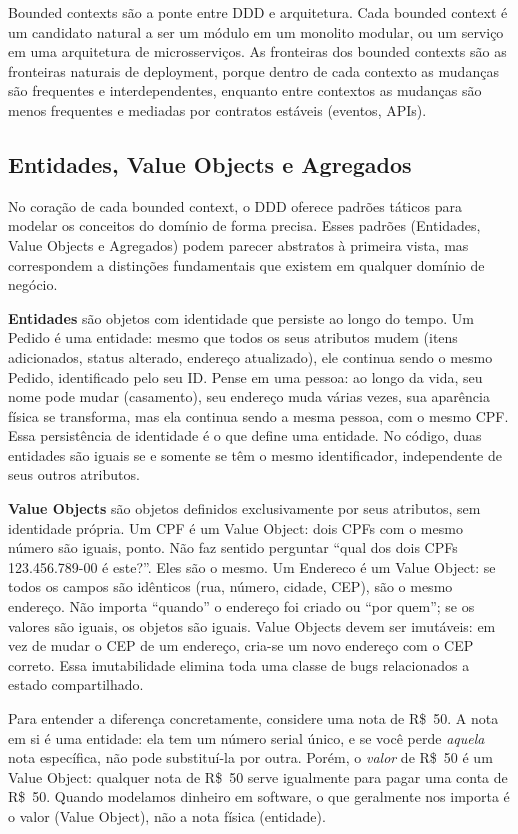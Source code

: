 Bounded contexts são a ponte entre DDD e arquitetura. Cada bounded context é um
candidato natural a ser um módulo em um monolito modular, ou um serviço em uma
arquitetura de microsserviços. As fronteiras dos bounded contexts são as
fronteiras naturais de deployment, porque dentro de cada contexto as mudanças
são frequentes e interdependentes, enquanto entre contextos as mudanças são
menos frequentes e mediadas por contratos estáveis (eventos, APIs).

\subsection{Entidades, Value Objects e Agregados}

No coração de cada bounded context, o DDD oferece padrões táticos para
modelar os conceitos do domínio de forma precisa. Esses padrões (Entidades,
Value Objects e Agregados) podem parecer abstratos à primeira vista, mas
correspondem a distinções fundamentais que existem em qualquer domínio de
negócio.

\textbf{Entidades} são objetos com identidade que persiste ao longo do tempo.
Um Pedido é uma entidade: mesmo que todos os seus atributos mudem (itens
adicionados, status alterado, endereço atualizado), ele continua sendo o mesmo
Pedido, identificado pelo seu ID. Pense em uma pessoa: ao longo da vida, seu
nome pode mudar (casamento), seu endereço muda várias vezes, sua aparência
física se transforma, mas ela continua sendo a mesma pessoa, com o mesmo
CPF. Essa persistência de identidade é o que define uma entidade. No código,
duas entidades são iguais se e somente se têm o mesmo identificador, independente
de seus outros atributos.

\textbf{Value Objects} são objetos definidos exclusivamente por seus atributos,
sem identidade própria. Um CPF é um Value Object: dois CPFs com o mesmo número
são iguais, ponto. Não faz sentido perguntar ``qual dos dois CPFs 123.456.789-00
é este?''. Eles são o mesmo. Um Endereco é um Value Object: se todos os campos
são idênticos (rua, número, cidade, CEP), são o mesmo endereço. Não importa
``quando'' o endereço foi criado ou ``por quem''; se os valores são iguais,
os objetos são iguais. Value Objects devem ser imutáveis: em vez de mudar o CEP
de um endereço, cria-se um novo endereço com o CEP correto. Essa imutabilidade
elimina toda uma classe de bugs relacionados a estado compartilhado.

Para entender a diferença concretamente, considere uma nota de R\$~50. A nota
em si é uma entidade: ela tem um número serial único, e se você perde \textit{aquela}
nota específica, não pode substituí-la por outra. Porém, o \textit{valor} de
R\$~50 é um Value Object: qualquer nota de R\$~50 serve igualmente para pagar
uma conta de R\$~50. Quando modelamos dinheiro em software, o que geralmente
nos importa é o valor (Value Object), não a nota física (entidade).

